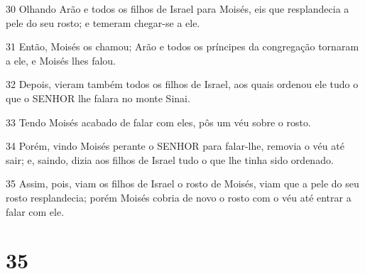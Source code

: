 \par 30 Olhando Arão e todos os filhos de Israel para Moisés, eis que resplandecia a pele do seu rosto; e temeram chegar-se a ele.
\par 31 Então, Moisés os chamou; Arão e todos os príncipes da congregação tornaram a ele, e Moisés lhes falou.
\par 32 Depois, vieram também todos os filhos de Israel, aos quais ordenou ele tudo o que o SENHOR lhe falara no monte Sinai.
\par 33 Tendo Moisés acabado de falar com eles, pôs um véu sobre o rosto.
\par 34 Porém, vindo Moisés perante o SENHOR para falar-lhe, removia o véu até sair; e, saindo, dizia aos filhos de Israel tudo o que lhe tinha sido ordenado.
\par 35 Assim, pois, viam os filhos de Israel o rosto de Moisés, viam que a pele do seu rosto resplandecia; porém Moisés cobria de novo o rosto com o véu até entrar a falar com ele.

\chapter{35}

